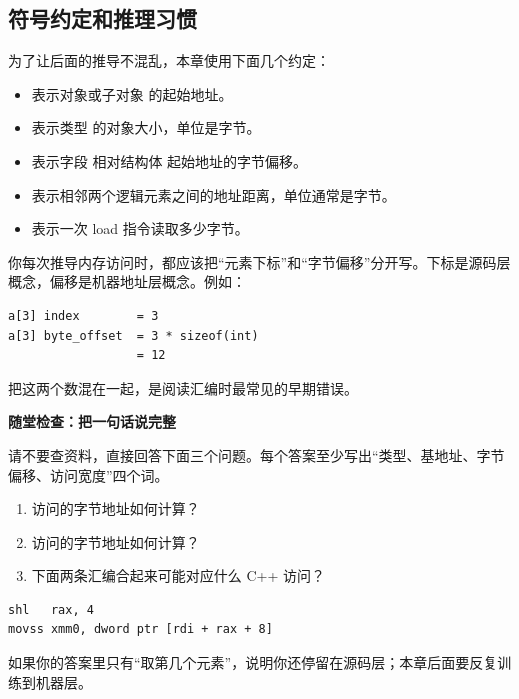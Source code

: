 \subsection{符号约定和推理习惯}

为了让后面的推导不混乱，本章使用下面几个约定：

\begin{itemize}
  \item {} 表示对象或子对象  的起始地址。
  \item {} 表示类型  的对象大小，单位是字节。
  \item {} 表示字段  相对结构体  起始地址的字节偏移。
  \item {} 表示相邻两个逻辑元素之间的地址距离，单位通常是字节。
  \item {} 表示一次 load 指令读取多少字节。
\end{itemize}

你每次推导内存访问时，都应该把“元素下标”和“字节偏移”分开写。下标是源码层概念，偏移是机器地址层概念。例如：

\begin{lstlisting}
a[3] index        = 3
a[3] byte_offset  = 3 * sizeof(int)
                  = 12
\end{lstlisting}

把这两个数混在一起，是阅读汇编时最常见的早期错误。

\begin{exercisebox}
\textbf{随堂检查：把一句话说完整}

请不要查资料，直接回答下面三个问题。每个答案至少写出“类型、基地址、字节偏移、访问宽度”四个词。

\begin{enumerate}
  \item {} 访问的字节地址如何计算？
  \item {} 访问的字节地址如何计算？
  \item 下面两条汇编合起来可能对应什么 C++ 访问？
\end{enumerate}

\begin{lstlisting}
shl   rax, 4
movss xmm0, dword ptr [rdi + rax + 8]
\end{lstlisting}

如果你的答案里只有“取第几个元素”，说明你还停留在源码层；本章后面要反复训练到机器层。
\end{exercisebox}

